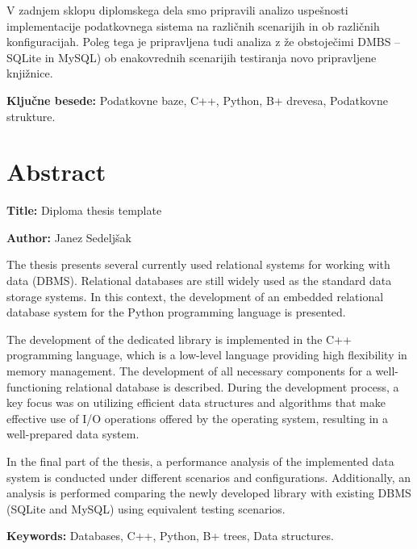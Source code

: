 \documentclass[a4paper,12pt,openright]{book}
\newcommand{\ttitleEn}{Diploma thesis template}
\newcommand{\tauthor}{Janez Sedeljšak}
\newcommand{\tkeywords}{Podatkovne baze, C++, Python, B+ drevesa, Podatkovne strukture}
\newcommand{\tkeywordsEn}{Databases, C++, Python, B+ trees, Data structures}
\newcommand{\clearemptydoublepage}{\newpage{\pagestyle{empty}\cleardoublepage}}
\begin{document}
V zadnjem sklopu diplomskega dela smo pripravili analizo uspešnosti implementacije podatkovnega sistema na različnih scenarijih in ob različnih konfiguracijah. Poleg tega je pripravljena tudi analiza z že obstoječimi DMBS – SQLite in MySQL) ob enakovrednih scenarijih testiranja novo pripravljene knjižnice.
\bigskip

\noindent\textbf{Ključne besede:} \tkeywords.
\clearemptydoublepage

{}
\chapter*{Abstract}

\noindent\textbf{Title:} \ttitleEn
\bigskip

\noindent\textbf{Author:} \tauthor
\bigskip

\noindent The thesis presents several currently used relational systems for working with data (DBMS). Relational databases are still widely used as the standard data storage systems. In this context, the development of an embedded relational database system for the Python programming language is presented.

The development of the dedicated library is implemented in the C++ programming language, which is a low-level language providing high flexibility in memory management. The development of all necessary components for a well-functioning relational database is described. During the development process, a key focus was on utilizing efficient data structures and algorithms that make effective use of I/O operations offered by the operating system, resulting in a well-prepared data system.

In the final part of the thesis, a performance analysis of the implemented data system is conducted under different scenarios and configurations. Additionally, an analysis is performed comparing the newly developed library with existing DBMS (SQLite and MySQL) using equivalent testing scenarios.
\bigskip

\noindent\textbf{Keywords:} \tkeywordsEn.
\clearemptydoublepage

\mainmatter
\setcounter{page}{1}
\pagestyle{fancy}

\end{document}
